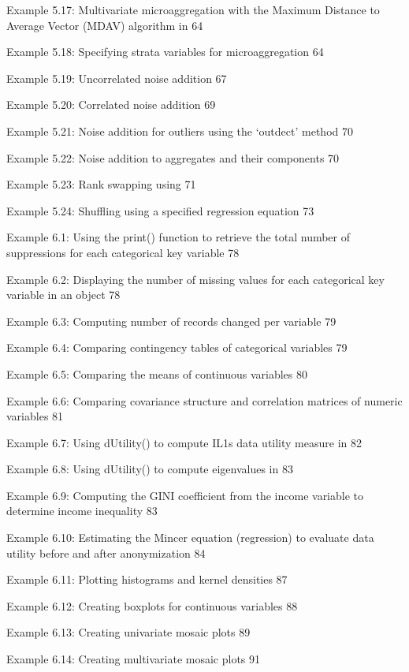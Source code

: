 \documentclass[letterpaper,10pt,english]{sphinxmanual}
\begin{document}
Example 5.17: Multivariate microaggregation with the Maximum Distance to
Average Vector (MDAV) algorithm in  64

Example 5.18: Specifying strata variables for microaggregation 64

Example 5.19: Uncorrelated noise addition 67

Example 5.20: Correlated noise addition 69

Example 5.21: Noise addition for outliers using the ‘outdect’ method 70

Example 5.22: Noise addition to aggregates and their components 70

Example 5.23: Rank swapping using  71

Example 5.24: Shuffling using a specified regression equation 73

Example 6.1: Using the print() function to retrieve the total number of
suppressions for each categorical key variable 78

Example 6.2: Displaying the number of missing values for each
categorical key variable in an  object 78

Example 6.3: Computing number of records changed per variable 79

Example 6.4: Comparing contingency tables of categorical variables 79

Example 6.5: Comparing the means of continuous variables 80

Example 6.6: Comparing covariance structure and correlation matrices of
numeric variables 81

Example 6.7: Using dUtility() to compute IL1s data utility measure in
 82

Example 6.8: Using dUtility() to compute eigenvalues in  83

Example 6.9: Computing the GINI coefficient from the income variable to
determine income inequality 83

Example 6.10: Estimating the Mincer equation (regression) to evaluate
data utility before and after anonymization 84

Example 6.11: Plotting histograms and kernel densities 87

Example 6.12: Creating boxplots for continuous variables 88

Example 6.13: Creating univariate mosaic plots 89

Example 6.14: Creating multivariate mosaic plots 91
\end{document}
